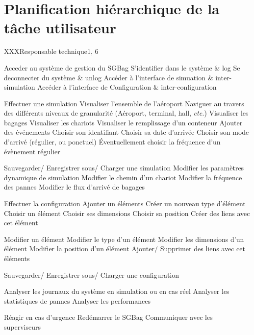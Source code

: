 \newpage
\part{Planification hiérarchique de la tâche utilisateur}

\phtu
{X}{XX}{Responsable technique}{1, 6}
{
\begin{tabular}
	\itm{} Acceder au système de gestion du SGBag
		\sitm{} S'identifier dans le système			& log
		\sitm{} Se deconnecter du système				& unlog
		\sitm{} Accéder à l'interface de simuation		& inter-simulation
		\sitm{} Accéder à l'interface de Configuration	& inter-configuration

	\itm{} Effectuer une simulation
		\sitm{} Visualiser l'ensemble de l'aéroport
			\ssitm{} Naviguer au travers des différents niveaux de granularité (Aéroport, terminal, hall, \textsl{etc.}) 
			\ssitm{} Visualiser les bagages
			\ssitm{} Visualiser les chariots
			\ssitm{} Visualiser le remplissage d'un conteneur
		\sitm{} Ajouter des événements
			\ssitm{} Choisir son identifiant
			\ssitm{} Choisir sa date d'arrivée
			\ssitm{} Choisir son mode d'arrivé (régulier, ou ponctuel)
			\ssitm{} Éventuellement choisir la fréquence d'un évènement régulier

		\sitm{} Sauvegarder/ Enregistrer sous/ Charger une simulation
		\sitm{} Modifier les paramètres dynamique de simulation
			\ssitm{} Modifier le chemin d'un chariot	
			\ssitm{} Modifier la fréquence des pannes
			\ssitm{} Modifier le flux d'arrivé de bagages
	
	\itm{} Effectuer la configuration
		\sitm{} Ajouter un éléments 
			\ssitm{} Créer un nouveau type d'élément
			\ssitm{} Choisir un élément
			\ssitm{} Choisir ses dimensions
			\ssitm{} Choisir sa position
			\ssitm{} Créer des liens avec cet élément

		\sitm{} Modifier un élément
			\ssitm{} Modifier le type d'un élément
			\ssitm{} Modifier les dimensions d'un élément
			\ssitm{} Modifier la position d'un élément
			\ssitm{} Ajouter/ Supprimer des liens avec cet éléments
		
		\sitm{} Sauvegarder/ Enregistrer sous/ Charger une configuration

	\itm{} Analyser les journaux du système en simulation ou en cas réel
		\sitm{} Analyser les statistiques de pannes
		\sitm{} Analyser les performances

	\itm{} Réagir en cas d'urgence 
		\sitm{} Redémarrer le SGBag
		\sitm{} Communiquer avec les superviseurs
		
\end{tabular}
}


